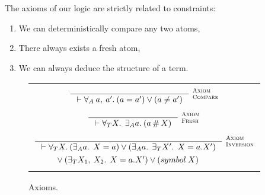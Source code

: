 \documentclass[english, mgr]{iithesis}
\newcommand{\scbrk}[2]{\myatop{\textsc{#1}}{\textsc{#2}}}
\begin{document}
The axioms of our logic are strictly related to constraints:
\begin{enumerate}
\item We can deterministically compare any two atoms,
\item There always exists a fresh atom,
\item We can always deduce the structure of a term.
\end{enumerate}
\begin{figure}[htpb]
  \centering
  \begin{tabularx}{\textwidth}{|C|}
  \hline
  \\ $
  \inference{
  }{
    \jgmnt[]{\fForallAtom{\:\atomv,\:\atomv'} (\atomv \ceq \atomv') \vee (\atomv \cneq \atomv')}
  }\:\scbrk{Axiom}{Compare}
  $ \\ \\ $
  \inference{
  }{
    \jgmnt[]{\fForallTerm{\termv} \:\fExistsAtom{\atomv} (\atomv \cfresh \termv)}
  }\:\scbrk{Axiom}{Fresh}
  $ \\ \\ $
  \inference{
  }{
    \jgmnt[]{\fForallTerm{\termv} (\fExistsAtom{\atomv}\: \termv = \atomv) \vee (\fExistsAtom{\atomv}\:\fExistsTerm{\termv'}\: \termv = \tbind{\atomv}{\termv'}) }
  }\:\scbrk{Axiom}{Inversion} $ \\
  $\vee \: (\exists_T X_1,\:X_2 .\:\: X = a.{X'}) \vee ({symbol}\: X) \qquad\qquad$ \\
  \\
  \hline
  \end{tabularx}
  \caption{Axioms.}
  \label{fig:axioms}
\end{figure}
\end{document}
